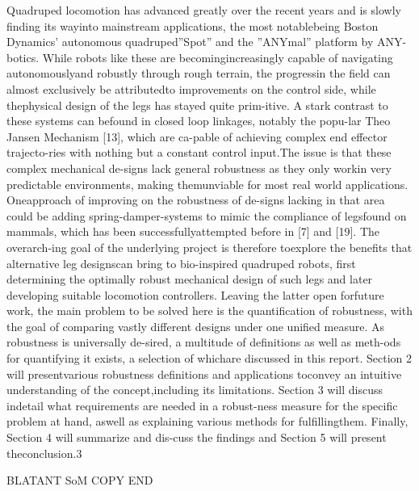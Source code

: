 Quadruped locomotion has advanced greatly over the  recent  years  and  is  slowly  finding  its  wayinto  mainstream  applications,  the  most  notablebeing Boston Dynamics’ autonomous quadruped”Spot”  and  the  ”ANYmal”  platform  by  ANY-botics.    While  robots  like  these  are  becomingincreasingly capable of navigating autonomouslyand robustly through rough terrain, the progressin the field can almost exclusively be attributedto  improvements  on  the  control  side,  while  thephysical design of the legs has stayed quite prim-itive.  A stark contrast to these systems can befound in closed loop linkages, notably the popu-lar  Theo  Jansen  Mechanism  [13],  which  are  ca-pable of achieving complex end effector trajecto-ries  with  nothing  but  a  constant  control  input.The  issue  is  that  these  complex  mechanical  de-signs lack general robustness as they only workin  very  predictable  environments,  making  themunviable  for  most  real  world  applications.   Oneapproach of improving on the robustness of de-signs lacking in that area could be adding spring-damper-systems to mimic the compliance of legsfound on mammals, which has been successfullyattempted before in [7] and [19].  The overarch-ing goal of the underlying project is therefore toexplore the benefits that alternative leg designscan bring to bio-inspired quadruped robots, first determining the optimally robust mechanical design of such legs and later developing suitable locomotion controllers.  Leaving the latter open forfuture work, the main problem to be solved here is the quantification of robustness, with the goal of  comparing  vastly  different  designs  under one unified measure.  As robustness is universally de-sired, a multitude of definitions as well as meth-ods for quantifying it exists, a selection of whichare discussed in this report. Section 2 will presentvarious robustness definitions and applications toconvey an intuitive understanding of the concept,including its limitations.  Section 3 will discuss indetail what requirements are needed in a robust-ness measure for the specific problem at hand, aswell  as  explaining  various  methods  for  fulfillingthem.  Finally, Section 4 will summarize and dis-cuss the findings and Section 5 will present theconclusion.3

BLATANT SoM COPY END

\fi